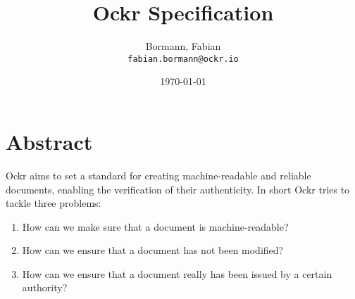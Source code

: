 \documentclass{article}
\title{Ockr Specification}
\author{
  Bormann, Fabian\\
  \texttt{fabian.bormann@ockr.io}
  \and
  \qrcode{https://github.com/ockr-io/ockr-specification/graphs/contributors}
}
\date{\today}
\begin{document}
\maketitle

\tableofcontents
\newpage

\section{Abstract}

Ockr aims to set a standard for creating machine-readable and reliable documents, 
enabling the verification of their authenticity. In short Ockr tries to tackle 
three problems:

\begin{enumerate}
    \item How can we make sure that a document is machine-readable?
    \item How can we ensure that a document has not been modified?
    \item How can we ensure that a document really has been issued by a certain authority?
\end{enumerate}
\newpage





\end{document}
